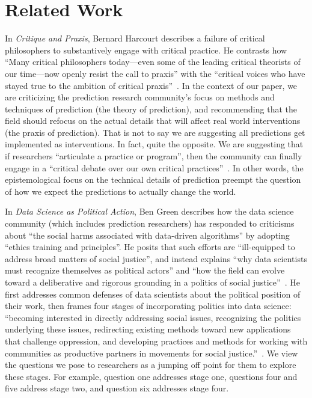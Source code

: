 \documentclass[12pt]{article}
\begin{document}
\section{Related Work}

    In \textit{Critique and Praxis}, Bernard Harcourt describes a failure of critical philosophers to substantively engage with critical practice. He contrasts how ``Many critical philosophers today—even some of the leading critical theorists of our time—now openly resist the call to praxis'' with the ``critical voices who have stayed true to the ambition of critical praxis''~\cite{critique-and-praxis}. In the context of our paper, we are criticizing the prediction research community's focus on methods and techniques of prediction (the theory of prediction), and recommending that the field should refocus on the actual details that will affect real world interventions (the praxis of prediction). That is not to say we are suggesting all predictions get implemented as interventions. In fact, quite the opposite. We are suggesting that if researchers ``articulate a practice or program'', then the community can finally engage in a ``critical debate over our own critical practices''~\cite{critique-and-praxis}.  In other words, the epistemological focus on the technical details of prediction preempt the question of how we expect the predictions to actually change the world. 

    In \textit{Data Science as Political Action}, Ben Green describes how the data science community (which includes prediction researchers) has responded to criticisms about ``the social harms associated with data-driven algorithms'' by adopting ``ethics training and principles''. He posits that such efforts are ``ill-equipped to address broad matters of social justice'', and instead explains ``why data scientists must recognize themselves as political actors'' and ``how the field can evolve toward a deliberative and rigorous grounding in a politics of social justice''~\cite{political-action}. He first addresses common defenses of data scientists about the political position of their work, then frames four stages of incorporating politics into data science: ``becoming interested in directly addressing social issues, recognizing the politics underlying these issues, redirecting existing methods toward new applications that challenge oppression, and developing practices and methods for working with communities as productive partners in movements for social justice.''~\cite{political-action}. We view the questions we pose to researchers as a jumping off point for them to explore these stages. For example, question one addresses stage one, questions four and five address stage two, and question six addresses stage four. 
    
\end{document}
